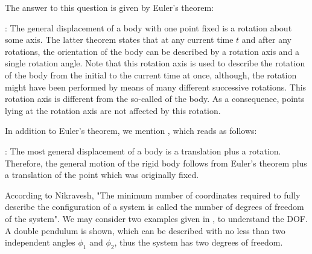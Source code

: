 The answer to this question is given by Euler's theorem:
\bi
  \item {}: The general displacement of a body with one point fixed is a rotation about some axis.
\ei
%
The latter theorem states that at any current time $t$ and after any rotations, the orientation of the body can be described by a rotation axis and a single rotation angle. Note that this rotation axis is used to describe the rotation of the body from the initial to the current time at once, although, the rotation might have been performed by means of many different successive rotations. This rotation axis is different from the so-called  of the body. As a consequence, points lying at the rotation axis are not affected by this rotation.

In addition to Euler's theorem, we mention , which reads as follows:
\bi
  \item {}: The most general displacement of a body is a translation plus a rotation.
\ei
Therefore, the general motion of the rigid body follows from Euler's theorem plus a translation of the point which was originally fixed.

According to Nikravesh, "The minimum number of coordinates required to fully describe the configuration of a system
is called the number of degrees of freedom of the system".
We may consider two examples given in , to understand the \ac{DOF}.
A double pendulum is shown, which can be described with no less than two independent angles $\phi_1$ and $\phi_2$, thus the system has two degrees of freedom. 

